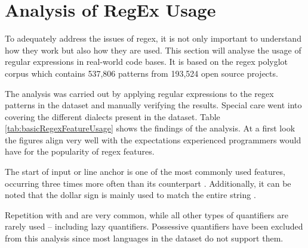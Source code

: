 \section{Analysis of RegEx Usage} \label{sec:analysisRegexUsage}

To adequately address the issues of regex, it is not only important to understand how they work but also how they are used. This section will analyse the usage of regular expressions in real-world code bases. It is based on the regex polyglot corpus \cite{RegexNotLinguaFranca} which contains 537,806 patterns from 193,524 open source projects.

The analysis was carried out by applying regular expressions to the regex patterns in the dataset and manually verifying the results. Special care went into covering the different dialects present in the dataset. Table \ref{tab:basicRegexFeatureUsage} shows the findings of the analysis. At a first look the figures align very well with the expectations experienced programmers would have for the popularity of regex features. 

The start of input or line anchor \pattern{\caret} is one of the most commonly used features, occurring three times more often than its counterpart \pattern{\dollar}. Additionally, it can be noted that the dollar sign is mainly used to match the entire string \pattern{\caret\placeholder\dollar}.

Repetition with \pattern{*} and \pattern{+} are very common, while all other types of quantifiers are rarely used -- including lazy quantifiers. Possessive quantifiers have been excluded from this analysis since most languages in the dataset do not support them. 


